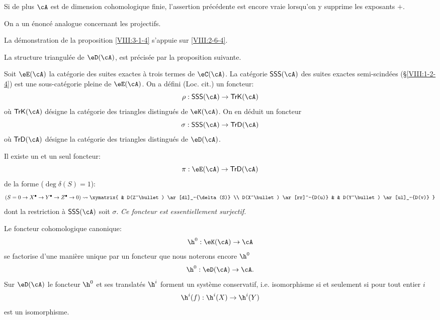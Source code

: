 Si de plus $\cA$ est de dimension cohomologique finie, l'assertion 
précédente est encore vraie lorsqu'on y supprime les exposants $+$. 

On a un énoncé analogue concernant les projectifs. 

La démonstration de la proposition \ref{VIII:3-1-4} s'appuie sur 
\ref{VIII:2-6-4}. 

La structure triangulée de $\eD(\cA)$, est précisée par la proposition 
suivante. 

Soit $\eE(\cA)$ la catégorie des suites exactes à trois termes de 
$\eC(\cA)$. La catégorie $\mathsf{SSS}(\cA)$ des suites exactes 
semi-scindées (\S\ref{VIII:1-2-4}) est une sous-catégorie pleine de 
$\eE(\cA)$. On a défini (Loc. cit.) un foncteur: 
\[
  \rho:\mathsf{SSS}(\cA) \to \mathsf{TrK}(\cA) 
\]
où $\mathsf{TrK}(\cA)$ désigne la catégorie des triangles distingués 
de $\eK(\cA)$. On en déduit un foncteur 
\[
  \sigma : \mathsf{SSS}(\cA) \to \mathsf{TrD}(\cA) 
\]
où $\mathsf{TrD}(\cA)$ désigne la catégorie des triangles distingués 
de $\eD(\cA)$. 





\begin{proposition}\label{VIII:3-1-5}
Il existe un et un seul foncteur: 
\[
  \pi:\eE(\cA) \to \mathsf{TrD}(\cA) 
\]
de la forme ($\deg \delta(S)=1$): 
\[
(S=0 \to X^\bullet \to Y^\bullet \to Z^\bullet \to 0) 
\leadsto 
\xymatrix{
  & D(Z^\bullet) \ar[dl]_-{\delta(S)} \\
  D(X^\bullet) \ar[rr]^-{D(u)} 
    & & D(Y^\bullet) \ar[ul]_-{D(v)} 
}
\]
dont la restriction à $\mathsf{SSS}(\cA)$ soit $\sigma$. \emph{Ce foncteur 
est essentiellement surjectif.}
\end{proposition}





\begin{proposition}\label{VIII:3-1-6}
Le foncteur cohomologique canonique: 
\[
  \h^0:\eK(\cA) \to \cA 
\]
se factorise d'une manière unique par un foncteur que nous noterons encore 
$\h^0$ 
\[
  \h^0:\eD(\cA) \to \cA \text{.}
\]
Sur $\eD(\cA)$ le foncteur $\h^0$ et ses translatés $\h^i$ forment un 
système conservatif, i.e.  
isomorphisme si et seulement si pour tout entier $i$ 
\[
  \h^i(f):\h^i(X) \to \h^i(Y) 
\]
est un isomorphisme. 
\end{proposition}






